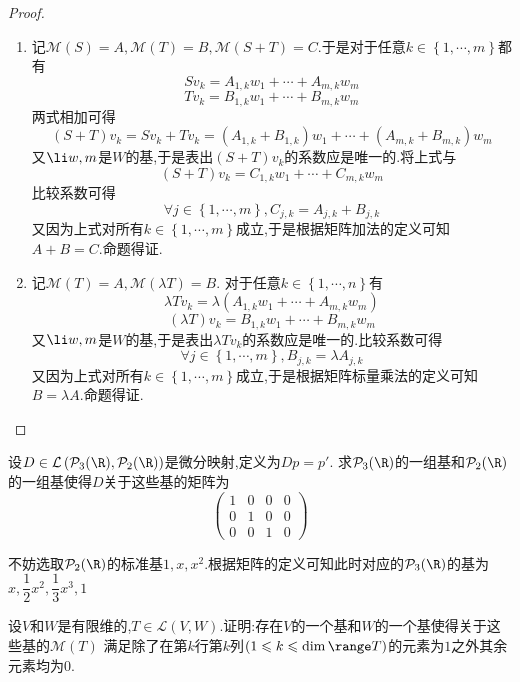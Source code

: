 \documentclass{ctexart}
\begin{document}
\begin{proof}
    \begin{enumerate}[label=\tbf{(\arabic*)}]
        \item 记$\mathcal{M}(S)=A,\mathcal{M}(T)=B,\mathcal{M}(S+T)=C$.于是对于任意$k\in\left\{1,\cdots,m\right\}$都有
            $$Sv_k=A_{1,k}w_1+\cdots+A_{m,k}w_m$$
            $$Tv_k=B_{1,k}w_1+\cdots+B_{m,k}w_m$$
            两式相加可得
            $$(S+T)v_k=Sv_k+Tv_k=\left(A_{1,k}+B_{1,k}\right)w_1+\cdots+\left(A_{m,k}+B_{m,k}\right)w_m$$
            又$\li w,m$是$W$的基,于是表出$(S+T)v_k$的系数应是唯一的.将上式与$$(S+T)v_k=C_{1,k}w_1+\cdots+C_{m,k}w_m$$
            比较系数可得
            $$\forall j\in\left\{1,\cdots,m\right\},C_{j,k}=A_{j,k}+B_{j,k}$$
            又因为上式对所有$k\in\left\{1,\cdots,m\right\}$成立,于是根据矩阵加法的定义可知$A+B=C$.命题得证.
        \item 记$\mathcal{M}(T)=A,\mathcal{M}(\lambda T)=B$.
            对于任意$k\in\left\{1,\cdots,n\right\}$有
            $$\lambda Tv_k=\lambda\left(A_{1,k}w_1+\cdots+A_{m,k}w_m\right)$$
            $$(\lambda T)v_k=B_{1,k}w_1+\cdots+B_{m,k}w_m$$
            又$\li w,m$是$W$的基,于是表出$\lambda Tv_k$的系数应是唯一的.比较系数可得
            $$\forall j\in\left\{1,\cdots,m\right\},B_{j,k}=\lambda A_{j,k}$$
            又因为上式对所有$k\in\left\{1,\cdots,m\right\}$成立,于是根据矩阵标量乘法的定义可知$B=\lambda A$.命题得证.
    \end{enumerate}
\end{proof}
\begin{problem}[4.]
    设$D\in\mathcal{L}\left(\mathcal{P}_3(\R),\mathcal{P}_2(\R)\right)$是微分映射,定义为$Dp=p'$.
    求$\mathcal{P}_3(\R)$的一组基和$\mathcal{P}_2(\R)$的一组基使得$D$关于这些基的矩阵为
    $$\begin{pmatrix}
        1 & 0 & 0 & 0 \\
        0 & 1 & 0 & 0 \\
        0 & 0 & 1 & 0
    \end{pmatrix}$$
\end{problem}
\begin{solution}[Solution.]
    不妨选取$\mathcal{P}_2(\R)$的标准基$1,x,x^2$.根据矩阵的定义可知此时对应的$\mathcal{P}_{3}(\R)$的基为$x,\dfrac{1}{2}x^2,\dfrac{1}{3}x^3,1$
\end{solution}
\begin{problem}[5.]
    设$V$和$W$是有限维的,$T\in\mathcal{L}(V,W)$.证明:存在$V$的一个基和$W$的一个基使得关于这些基的$\mathcal{M}(T)$%
    满足除了在第$k$行第$k$列$(1\leqslant k\leqslant\dim\range T)$的元素为$1$之外其余元素均为$0$.
\end{problem}
\end{document}
